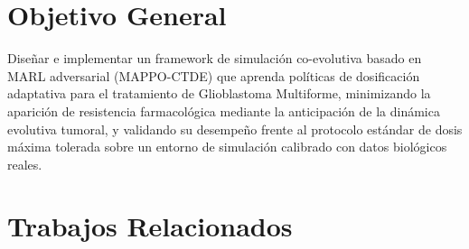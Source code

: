 \documentclass[a4paper,11pt]{article}
\begin{document}
\section{Objetivo General}

Diseñar e implementar un framework de simulación co-evolutiva basado en MARL
adversarial (MAPPO-CTDE) que aprenda políticas de dosificación adaptativa para
el tratamiento de Glioblastoma Multiforme, minimizando la aparición de
resistencia farmacológica mediante la anticipación de la dinámica evolutiva
tumoral, y validando su desempeño frente al protocolo estándar de dosis máxima
tolerada sobre un entorno de simulación calibrado con datos biológicos reales.

\section{Trabajos Relacionados}
\end{document}
